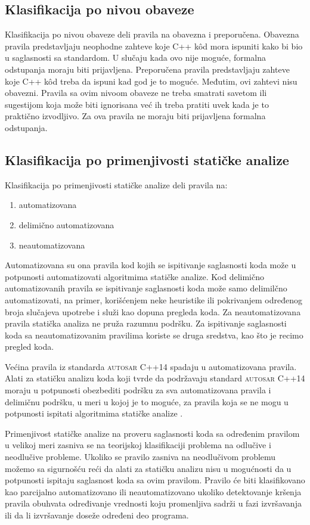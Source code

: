 \documentclass[12pt,oneside]{memoir}
\begin{document}
\subsection{Klasifikacija po nivou obaveze}
Klasifikacija po nivou obaveze deli pravila na obavezna i preporučena.
Obavezna pravila predstavljaju neophodne zahteve koje C++ k\^{o}d mora ispuniti kako bi bio u saglasnosti sa standardom. U slučaju kada ovo nije moguće,
formalna odstupanja moraju biti prijavljena.
Preporučena pravila predstavljaju zahteve koje C++ k\^{o}d treba da ispuni kad god je to mogu\'{c}e. Međutim, ovi zahtevi nisu obavezni. Pravila
sa ovim nivoom obaveze ne treba smatrati savetom ili sugestijom koja može biti ignorisana ve\'{c} ih treba pratiti uvek kada je to prakti\v{c}no izvodljivo. Za ova pravila ne moraju biti prijavljena formalna odstupanja.

\subsection{Klasifikacija po primenjivosti statičke analize}
Klasifikacija po primenjivosti statičke analize deli pravila na: 
\begin{enumerate}
  \item{automatizovana}
  \item{delimično automatizovana}
  \item{neautomatizovana}
\end{enumerate}
Automatizovana su ona pravila kod kojih se ispitivanje saglasnosti koda može u potpunosti automatizovati algoritmima statičke analize.
Kod delimično automatizovanih pravila se ispitivanje saglasnosti koda može samo delimilčno automatizovati, na primer, korišćenjem neke heuristike ili pokrivanjem određenog broja slučajeva upotrebe i služi kao dopuna pregleda koda.
Za neautomatizovana pravila statička analiza ne pruža razumnu podršku. Za ispitivanje saglasnosti koda sa neautomatizovanim pravilima koriste se druga sredstva, kao što je recimo pregled koda.

\indent
Većina pravila iz standarda \textsc{autosar} C++14 spadaju u automatizovana pravila. Alati za statičku analizu koda koji tvrde da podržavaju standard \textsc{autosar} C++14 moraju u potpunosti obezbediti podršku za sva automatizovana pravila i delimičnu podršku, u meri u kojoj je to moguće, za pravila koja se ne mogu u potpunosti ispitati algoritmima statičke analize \cite{AutosarGuidelines}.

\indent
Primenjivost statičke analize na proveru saglasnosti koda sa određenim pravilom u velikoj meri zasniva se na teorijskoj klasifikaciji problema
na odlučive i neodlučive probleme. Ukoliko se pravilo zasniva na neodlučivom problemu možemo sa sigurnošću reći da alati za statičku analizu nisu u mogućnosti da u potpunosti ispitaju saglasnost koda sa ovim pravilom. Pravilo će biti klasifikovano kao parcijalno automatizovano ili neautomatizovano ukoliko detektovanje kršenja pravila obuhvata određivanje vrednosti koju promenljiva sadrži u fazi izvr\v{s}avanja ili da li izvr\v{s}avanje doseže određeni deo programa.
\end{document}
